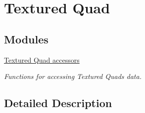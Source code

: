 \hypertarget{group____quad}{\section{Textured Quad}
\label{group____quad}
}
\subsection*{Modules}
\begin{DoxyCompactItemize}
\item 
\hyperlink{group____accessors__quad}{Textured Quad accessors}
\begin{DoxyCompactList}\small\item\em Functions for accessing Textured Quads data. \end{DoxyCompactList}\end{DoxyCompactItemize}


\subsection{Detailed Description}
